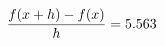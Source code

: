 \documentclass[preview]{standalone}
\begin{document}
\begin{align*}
\special{dvisvgm:raw <g id='unique000'>}\frac{f(x+h)-f(x)}{h} = 5.563\special{dvisvgm:raw </g>}
\end{align*}
\end{document}
